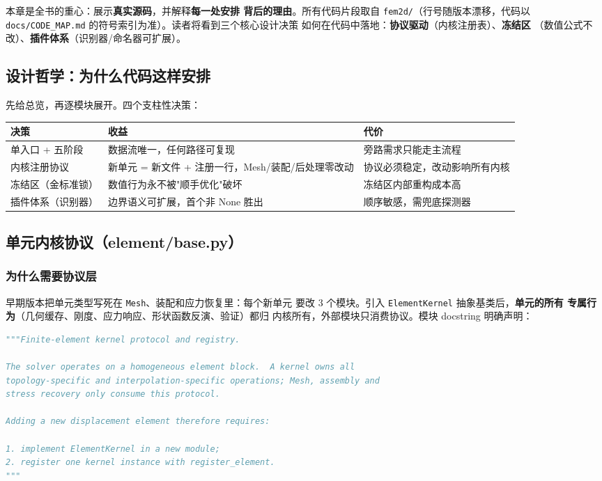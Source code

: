 \documentclass[12pt,a4paper]{ctexart}
\newcommand{\fem}{\Verb}
\begin{document}
本章是全书的重心：展示\textbf{真实源码}，并解释\textbf{每一处安排
背后的理由}。所有代码片段取自 \fem|fem2d/|（行号随版本漂移，代码以
\fem|docs/CODE_MAP.md| 的符号索引为准）。读者将看到三个核心设计决策
如何在代码中落地：\textbf{协议驱动}（内核注册表）、\textbf{冻结区}
（数值公式不改）、\textbf{插件体系}（识别器/命名器可扩展）。

\subsection{设计哲学：为什么代码这样安排}

先给总览，再逐模块展开。四个支柱性决策：

\begin{table}[h]
\centering
\small
\begin{tabular}{p{3.2cm}p{5.6cm}p{6.2cm}}
\toprule
\textbf{决策} & \textbf{收益} & \textbf{代价} \\
\midrule
单入口 + 五阶段 & 数据流唯一，任何路径可复现 & 旁路需求只能走主流程 \\
内核注册协议 & 新单元 = 新文件 + 注册一行，Mesh/装配/后处理零改动 & 协议必须稳定，改动影响所有内核 \\
冻结区（金标准锁） & 数值行为永不被"顺手优化"破坏 & 冻结区内部重构成本高 \\
插件体系（识别器） & 边界语义可扩展，首个非 None 胜出 & 顺序敏感，需兜底探测器 \\
\bottomrule
\end{tabular}
\end{table}

\subsection{单元内核协议（element/base.py）}

\subsubsection{为什么需要协议层}

早期版本把单元类型写死在 \fem|Mesh|、装配和应力恢复里：每个新单元
要改 3 个模块。引入 \fem|ElementKernel| 抽象基类后，\textbf{单元的所有
专属行为}（几何缓存、刚度、应力响应、形状函数反演、验证）都归
内核所有，外部模块只消费协议。模块 docstring 明确声明：

\begin{lstlisting}[language=python]
"""Finite-element kernel protocol and registry.

The solver operates on a homogeneous element block.  A kernel owns all
topology-specific and interpolation-specific operations; Mesh, assembly and
stress recovery only consume this protocol.

Adding a new displacement element therefore requires:

1. implement ElementKernel in a new module;
2. register one kernel instance with register_element.
"""
\end{lstlisting}
\end{document}
